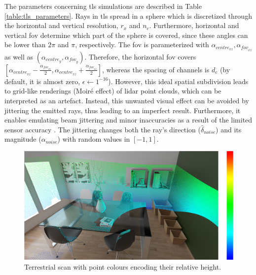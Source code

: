 The parameters concerning \acrshort{tls} simulations are described in Table \ref{table:tls_parameters}. Rays in \acrshort{tls} spread in a sphere which is discretized through the horizontal and vertical resolution, $r_x$ and $n_c$. Furthermore, horizontal and vertical \acrshort{fov} determine which part of the sphere is covered, since these angles can be lower than $2\pi$ and $\pi$, respectively. The \acrshort{fov} is parameterized with $\alpha_{\textit{centre}_{xz}}, \alpha_{\textit{fov}_{xz}}$ as well as $(\alpha_{\textit{centre}_{y}}, \alpha_{\textit{fov}_{y}})$. Therefore, the horizontal \acrshort{fov} covers $[\alpha_{\textit{centre}_{xz}} - \frac{\alpha_{\textit{fov}_{xz}}}{2}, \alpha_{\textit{centre}_{xz}} + \frac{\alpha_{\textit{fov}_{xz}}}{2}]$, whereas the spacing of channels is $d_c$ (by default, it is almost zero, $\epsilon \gets 1^{-16}$). However, this ideal spatial subdivision leads to grid-like renderings (Moiré effect) of \acrshort{lidar} point clouds, which can be interpreted as an artefact. Instead, this unwanted visual effect can be avoided by jittering \cite{akenine-moller_real-time_2018} the emitted rays, thus leading to an imperfect result. Furthermore, it enables emulating beam jittering and minor inaccuracies as a result of the limited sensor accuracy \cite{mcmanamon_lidar_2019}. The jittering changes both the ray's direction ($\hat{\delta}_{\textit{noise}}$) and its magnitude ($\alpha_{\textit{noise}}$) with random values in $[-1, 1]$.

\begin{figure}[ht]
	\centering
	\includegraphics[width=\linewidth]{figs/lidar_simulation/tls_first_approach.png}
	\caption{Terrestrial scan with point colours encoding their relative height.}
	\label{fig:tls_first_approach}
\end{figure}

